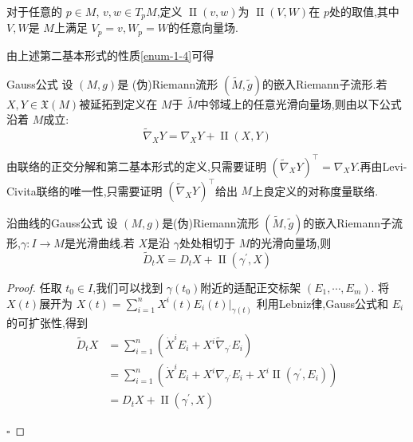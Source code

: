 \documentclass[../../几何与拓扑.tex]{subfiles}
\begin{document}
\begin{definition}
    对于任意的 \(  p \in M  \), \(  v,w \in T_{p}M  \),定义 \(  \operatorname{II}\left( v,w \right)   \)为 \(  \operatorname{II}\left( V,W \right)   \)在 \(  p  \)处的取值,其中 \(  V,W  \)是 \(  M  \)上满足 \(  V_{p}= v,W_{p}= W  \)的任意向量场.        
\end{definition}
\begin{remark}
    由上述第二基本形式的性质\ref{enum-1-4}可得
\end{remark}


\begin{theorem}{Gauss公式}
    设 \(  \left( M,g \right)   \)是 (伪)Riemann流形 \(  \left( \tilde{M},\tilde{g}  \right)   \)的嵌入Riemann子流形.若 \(  X,Y  \in \mathfrak{X}\left( M \right) \)被延拓到定义在 \(  M  \)于 \(  \tilde{M}  \)中邻域上的任意光滑向量场,则由以下公式沿着 \(  M  \)成立: \[
     \tilde{\nabla} _{X}Y=  \nabla _{X}Y+ \operatorname{II}\left( X,Y \right) 
    \]      
\end{theorem}

\begin{note}
    由联络的正交分解和第二基本形式的定义,只需要证明 \(  \left(  \tilde{\nabla} _{X}Y \right)^{\top}=  \nabla _{X}Y   \).再由Levi-Civita联络的唯一性,只需要证明 \(  \left(  \tilde{\nabla} _{X}Y \right)^{\top}   \)给出 \(  M  \)上良定义的对称度量联络.    

\end{note}

\begin{corollary}{沿曲线的Gauss公式}
    设 \(  \left( M,g \right)   \)是(伪)Riemann流形 \(  \left( \tilde{M}, \tilde{g}  \right)   \)的嵌入Riemann子流形,\(   \gamma :I\to M  \)是光滑曲线.若 \(  X  \)是沿 \(   \gamma   \)处处相切于 \(  M  \)的光滑向量场,则 \[
    \tilde{D}_{t}X= D_{t}X+ \operatorname{II}\left(  \gamma ^{\prime} ,X \right) 
    \]      
\end{corollary}

\begin{proof}
    任取 \(  t_0 \in I  \),我们可以找到 \(   \gamma \left( t_0 \right)   \)附近的适配正交标架 \(  \left(  E_1,\cdots,E_m  \right)   \).   将 \(  X\left( t \right)   \)展开为 \(  X\left( t \right)= \sum _{i= 1}^{n}X^{i}\left( t \right)E_{i}\left( t \right)|_{ \gamma \left( t \right) }     \)  利用Lebniz律,Gauss公式和 \(  E_{i}  \)的可扩张性,得到 \[
    \begin{aligned}
    \tilde{D}_{t}X& =  \sum _{i= 1}^{n}\left( \dot{X}^{i}E_{i}+ X^{i} \tilde{\nabla} _{ \gamma ^{\prime} }E_{i} \right)  \\ 
     & = \sum _{i= 1}^{n}\left( \dot{X}^{i}E_{i}+ X^{i} \nabla _{ \gamma ^{\prime} }E_{i}+ X^{i}\operatorname{II}\left(  \gamma ^{\prime} ,E_{i} \right)  \right)\\ 
       & = D_{t}X+ \operatorname{II}\left(  \gamma ^{\prime} ,X \right)  
    \end{aligned}
    \] 

    \hfill $\square$
\end{proof}
\end{document}
